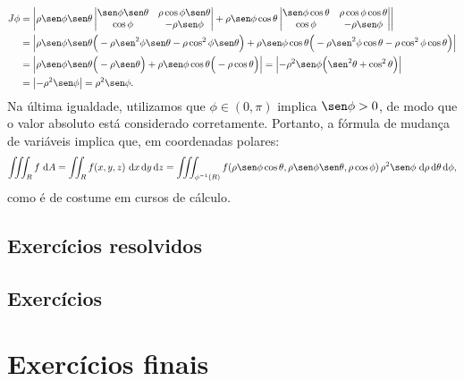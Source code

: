 \begin{equation}
\begin{split}
J\phi & = \left| \rho \sen \phi \sen \theta
\left|
\begin{matrix}
\sen \phi \sen \theta     & \rho \cos \phi \sen \theta  \\
\cos \phi                 &    -\rho \sen \phi
\end{matrix}
\right| + \rho \sen \phi \cos \theta
\left|
\begin{matrix}
\sen \phi \cos \theta      & \rho \cos \phi \cos \theta \\
\cos \phi                  &    -\rho \sen \phi
\end{matrix}
\right| \right|  \\
& = \left| \rho \sen \phi \sen \theta \Big(- \rho \sen^2 \phi \sen \theta - \rho \cos^2 \phi \sen \theta \Big)  + \rho \sen \phi \cos \theta \Big(- \rho \sen^2 \phi \cos \theta - \rho \cos^2 \phi \cos \theta \Big) \right|  \\
& =  \left| \rho \sen \phi \sen \theta \Big (- \rho \sen \theta \Big) + \rho \sen \phi \cos \theta \Big(- \rho \cos \theta \Big) \right|  = \left|  - \rho^2 \sen \phi \Big( \sen^2 \theta + \cos^2 \theta \Big) \right| \\
& = \left| - \rho^2 \sen \phi \right| = \rho^2 \sen \phi.
\end{split}
\end{equation}
Na última igualdade, utilizamos que $\phi \in (0,\pi)$ implica $\sen \phi > 0$, de modo que o valor absoluto está considerado corretamente. Portanto, a fórmula de mudança de variáveis implica que, em coordenadas polares:
\begin{equation}
\iiint_R f \, \, \mathrm{d} A = \iint_R f(x,y, z) \, \, \mathrm{d} x \, \mathrm{d} y \, \mathrm{d} z = \iiint_{\phi^{-1}(R)} f(\rho \sen \phi \cos \theta, \rho \sen \phi \sen \theta, \rho \cos \phi) \, \rho^2 \sen \phi \, \, \mathrm{d} \rho \, \mathrm{d} \theta \, \mathrm{d} \phi,
\end{equation} como é de costume em cursos de cálculo.


\subsection*{Exercícios resolvidos}

\construirExeresol

\subsection*{Exercícios}

\construirExer

\section{Exercícios finais}

\construirExer

%
